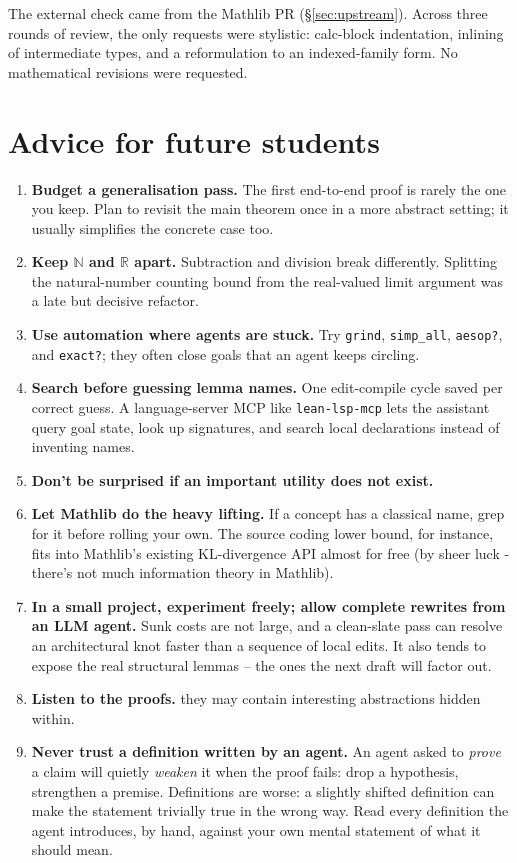 \documentclass[11pt]{article}
\begin{document}
The external check came from the \textsf{Mathlib} PR (\S\ref{sec:upstream}).
Across three rounds of review, the only requests were stylistic: calc-block
indentation, inlining of intermediate types, and a reformulation to an
indexed-family form. No mathematical revisions were requested.

\section{Advice for future students}

\begin{enumerate}[leftmargin=1.5em,itemsep=1pt]
  \item \textbf{Budget a generalisation pass.} The first end-to-end proof
    is rarely the one you keep. Plan to revisit the main theorem once in
    a more abstract setting; it usually simplifies the concrete case too.
  \item \textbf{Keep $\mathbb{N}$ and $\mathbb{R}$ apart.} Subtraction
    and division break differently. Splitting the natural-number counting
    bound from the real-valued limit argument was a late but decisive
    refactor.
  \item \textbf{Use automation where agents are stuck.} Try
    \texttt{grind}, \texttt{simp\_all}, \texttt{aesop?}, and
    \texttt{exact?}; they often close goals that an agent keeps circling.
  \item \textbf{Search before guessing lemma names.} One edit-compile
    cycle saved per correct guess. A language-server MCP like
    \texttt{lean-lsp-mcp} lets the assistant query goal state, look up
    signatures, and search local declarations instead of inventing names.
  \item \textbf{Don't be surprised if an important utility does not exist.} 
  \item \textbf{Let \textsf{Mathlib} do the heavy lifting.} If a concept
    has a classical name, grep for it before rolling your own. The
    source coding lower bound, for instance, fits into \textsf{Mathlib}'s
    existing KL-divergence API almost for free (by sheer luck - there's not much information theory in \textsf{Mathlib}).
  \item \textbf{In a small project, experiment freely; allow complete rewrites from an LLM agent.} Sunk costs are not large, and a clean-slate pass can resolve an architectural knot faster than a sequence of local edits. It also  tends to expose the real structural lemmas -- the ones the next draft will factor out.
  \item \textbf{Listen to the proofs.} they may contain interesting abstractions hidden within.
  \item \textbf{Never trust a definition written by an agent.} An agent
    asked to \emph{prove} a claim will quietly \emph{weaken} it when the
    proof fails: drop a hypothesis, strengthen a premise. Definitions are worse: a slightly shifted definition can
    make the statement trivially true in the wrong way. Read every
    definition the agent introduces, by hand, against your own mental
    statement of what it should mean.
\end{enumerate}
\end{document}
